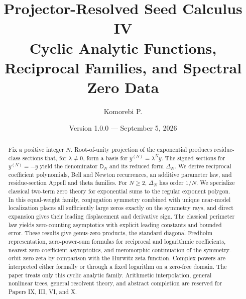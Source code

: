 \documentclass[11pt]{article}
\title{\textbf{Projector-Resolved Seed Calculus IV}\\[0.45em]
\large Cyclic Analytic Functions, Reciprocal Families, and Spectral Zero Data}
\author{Komorebi P.}
\date{Version 1.0.0 --- September 5, 2026}
\theoremstyle{definition}
\theoremstyle{remark}
\newcommand{\Dfun}{\mathsf D}
\begin{document}
\maketitle
\begin{abstract}
Fix a positive integer $N$. Root-of-unity projection of the exponential
produces residue-class sections that, for $\lambda\ne0$, form a basis for
$y^{(N)}=\lambda^N y$. The signed sections for $y^{(N)}=-y$ yield the
denominator $\Dfun_N$ and its reduced form $\Delta_N$. We derive reciprocal
coefficient polynomials, Bell and Newton recurrences, an additive parameter
law, and residue-section Appell and theta families. For $N\geq2$,
$\Delta_N$ has order $1/N$. We specialize classical two-term zero theory for
exponential sums to the regular exponent polygon. In this equal-weight family,
conjugation symmetry combined with unique near-model localization places all
sufficiently large zeros exactly on the symmetry rays, and direct expansion
gives their leading displacement and derivative sign. The classical perimeter
law yields zero-counting asymptotics with explicit leading constants and
bounded error. These results give genus-zero products, the standard diagonal
Fredholm representation, zero-power-sum formulas for reciprocal and
logarithmic coefficients, nearest-zero coefficient asymptotics, and
meromorphic continuation of the symmetry-orbit zero zeta by comparison with
the Hurwitz zeta function. Complex powers are interpreted either formally or
through a fixed logarithm on a zero-free domain. The paper treats only this
cyclic analytic family. Arithmetic interpolation, general nonlinear trees,
general resolvent theory, and abstract completion are reserved for Papers IX,
III, VI, and X.
\end{abstract}

\begin{center}
\end{center}
\end{document}
